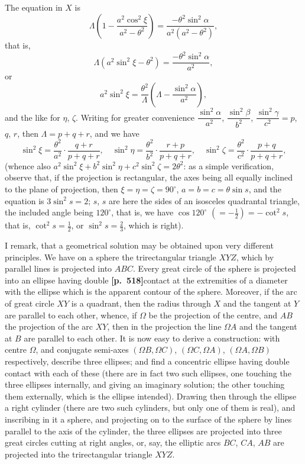 \documentclass[11pt,a4paper]{article}
\begin{document}
The equation in $X$ is
\[
\Lambda\left(1 - \frac{a^{2}\cos^{2}\xi}{a^{2} - \theta^{2}}\right) = \frac{-\theta^{2}\sin^{2}\alpha}{a^{2}(a^{2} - \theta^{2})},
\]
that is,
\[
\Lambda(a^{2}\sin^{2}\xi - \theta^{2}) = \frac{-\theta^{2}\sin^{2}\alpha}{a^{2}},
\]
or
\[
a^{2}\sin^{2}\xi = \frac{\theta^{2}}{\Lambda}\left(\Lambda - \frac{\sin^{2}\alpha}{a^{2}}\right),
\]
and the like for $\eta$, $\zeta$. Writing for greater convenience $\dfrac{\sin^{2}\alpha}{a^{2}}$, $\dfrac{\sin^{2}\beta}{b^{2}}$, $\dfrac{\sin^{2}\gamma}{c^{2}} = p$, $q$, $r$, then $\Lambda = p + q + r$, and we have
\[
\sin^{2}\xi = \frac{\theta^{2}}{a^{2}} \cdot \frac{q + r}{p + q + r},\quad \sin^{2}\eta = \frac{\theta^{2}}{b^{2}} \cdot \frac{r + p}{p + q + r},\quad \sin^{2}\zeta = \frac{\theta^{2}}{c^{2}} \cdot \frac{p + q}{p + q + r},
\]
(whence also $a^{2}\sin^{2}\xi + b^{2}\sin^{2}\eta + c^{2}\sin^{2}\zeta = 2\theta^{2}$: as a simple verification, observe that, if the projection is rectangular, the axes being all equally inclined to the plane of projection, then $\xi = \eta = \zeta = 90^{\circ}$, $a = b = c = \theta\sin s$, and the equation is $3\sin^{2}s = 2$; $s$, $s$ are here the sides of an isosceles quadrantal triangle, the included angle being $120^{\circ}$, that is, we have $\cos 120^{\circ}$ $(= -\tfrac{1}{2}) = -\cot^{2}s$, that is, $\cot^{2}s = \tfrac{1}{2}$, or $\sin^{2}s = \tfrac{2}{3}$, which is right).

I remark, that a geometrical solution may be obtained upon very different principles. We have on a sphere the trirectangular triangle $XYZ$, which by parallel lines is projected into $ABC$. Every great circle of the sphere is projected into an ellipse having double \noindent\textbf{[p.~518]}\quad contact at the extremities of a diameter with the ellipse which is the apparent contour of the sphere. Moreover, if the arc of great circle $XY$ is a quadrant, then the radius through $X$ and the tangent at $Y$ are parallel to each other, whence, if $\Omega$ be the projection of the centre, and $AB$ the projection of the arc $XY$, then in the projection the line $\Omega A$ and the tangent at $B$ are parallel to each other. It is now easy to derive a construction: with centre $\Omega$, and conjugate semi-axes $(\Omega B, \Omega C)$, $(\Omega C, \Omega A)$, $(\Omega A, \Omega B)$ respectively, describe three ellipses; and find a concentric ellipse having double contact with each of these (there are in fact two such ellipses, one touching the three ellipses internally, and giving an imaginary solution; the other touching them externally, which is the ellipse intended). Drawing then through the ellipse a right cylinder (there are two such cylinders, but only one of them is real), and inscribing in it a sphere, and projecting on to the surface of the sphere by lines parallel to the axis of the cylinder, the three ellipses are projected into three great circles cutting at right angles, or, say, the elliptic arcs $BC$, $CA$, $AB$ are projected into the trirectangular triangle $XYZ$.
\end{document}
